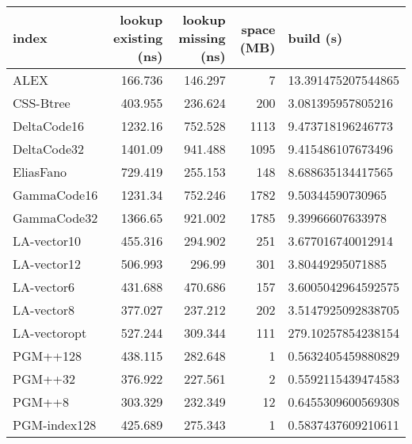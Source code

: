 \begin{tabular}{lrrrl}
\hline
 index             &   lookup existing (ns) &   lookup missing (ns) &   space (MB) & build (s)            \\
\hline
 ALEX              &                166.736 &              146.297  &            7 & 13.391475207544865   \\
 CSS-Btree         &                403.955 &              236.624  &          200 & 3.081395957805216    \\
 DeltaCode16       &               1232.16  &              752.528  &         1113 & 9.473718196246773    \\
 DeltaCode32       &               1401.09  &              941.488  &         1095 & 9.415486107673496    \\
 EliasFano         &                729.419 &              255.153  &          148 & 8.688635134417565    \\
 GammaCode16       &               1231.34  &              752.246  &         1782 & 9.50344590730965     \\
 GammaCode32       &               1366.65  &              921.002  &         1785 & 9.39966607633978     \\
 LA-vector10       &                455.316 &              294.902  &          251 & 3.677016740012914    \\
 LA-vector12       &                506.993 &              296.99   &          301 & 3.80449295071885     \\
 LA-vector6        &                431.688 &              470.686  &          157 & 3.6005042964592575   \\
 LA-vector8        &                377.027 &              237.212  &          202 & 3.5147925092838705   \\
 LA-vectoropt      &                527.244 &              309.344  &          111 & 279.10257854238154   \\
 PGM++128          &                438.115 &              282.648  &            1 & 0.5632405459880829   \\
 PGM++32           &                376.922 &              227.561  &            2 & 0.5592115439474583   \\
 PGM++8            &                303.329 &              232.349  &           12 & 0.6455309600569308   \\
 PGM-index128      &                425.689 &              275.343  &            1 & 0.5837437609210611   \\

\end{tabular}
